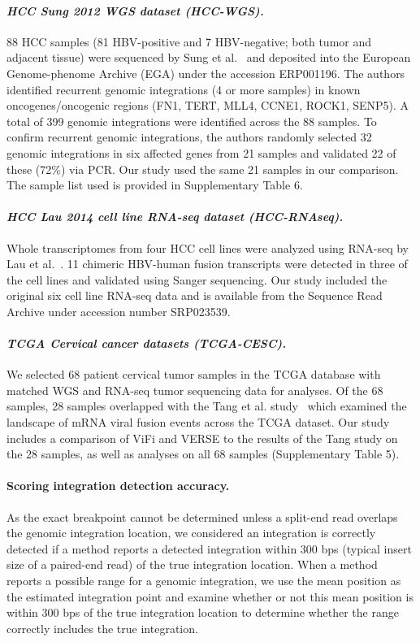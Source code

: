 \documentclass[a4,center,fleqn]{NAR}
\begin{document}
\paragraph{\emph{HCC Sung 2012 WGS dataset (HCC-WGS).}}
88 HCC samples (81 HBV-positive and 7 HBV-negative; both tumor and adjacent tissue) were sequenced by Sung et al.~\cite{Sung2012} and deposited into the European Genome-phenome Archive (EGA) under the accession ERP001196.  The authors identified recurrent genomic integrations (4 or more samples) in known oncogenes/oncogenic regions (FN1, TERT, MLL4, CCNE1, ROCK1, SENP5).  A total of 399 genomic integrations were identified across the 88 samples.  To confirm recurrent genomic integrations, the authors randomly selected 32 genomic integrations in six affected genes from 21 samples and validated 22 of these (72\%) via PCR.  Our study used the same 21 samples in our comparison.  The sample list used is provided in Supplementary Table 6. 

\paragraph{\emph{HCC Lau 2014 cell line RNA-seq dataset (HCC-RNAseq).}}
Whole transcriptomes from four HCC cell lines were analyzed using RNA-seq by Lau et al.~\cite{Lau2014}.  11 chimeric HBV-human fusion transcripts were detected in three of the cell lines and validated using Sanger sequencing.  Our study included the original six cell line RNA-seq data and is available from the Sequence Read Archive under accession number SRP023539.

\paragraph{\emph{TCGA Cervical cancer datasets (TCGA-CESC).}}
We selected 68 patient cervical tumor samples in the TCGA database with matched WGS and RNA-seq tumor sequencing data for analyses.  Of the 68 samples, 28 samples overlapped with the Tang et al. study~\cite{Tang2013} which examined the landscape of mRNA viral fusion events across the TCGA dataset.  Our study includes a comparison of ViFi and VERSE to the results of the Tang study on the 28 samples, as well as analyses on all 68 samples (Supplementary Table 5).

\paragraph{\textbf{Scoring integration detection accuracy.}}
As the exact breakpoint cannot be determined unless a split-end read overlaps the genomic integration location, we considered an integration is correctly detected if a method reports a detected integration within 300 bps (typical insert size of a paired-end read) of the true integration location.  When a method reports a possible range for a genomic integration, we use the mean position as the estimated integration point and examine whether or not this mean position is within 300 bps of the true integration location to determine whether the range correctly includes the true integration.
\end{document}
